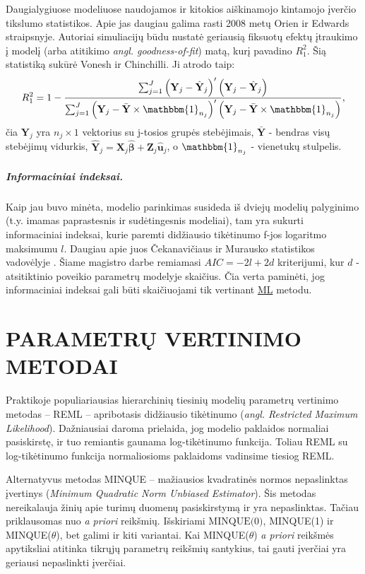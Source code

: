 \documentclass[11pt,a4paper]{article}
\begin{document}
\indent Daugialygiuose modeliuose naudojamos ir kitokios aiškinamojo kintamojo įverčio tikslumo statistikos. Apie jas daugiau galima rasti 2008 metų Orien ir Edwards\cite{fixedTest} straipsnyje. Autoriai simuliacijų būdu nustatė geriausią fiksuotų efektų įtraukimo į modelį (arba atitikimo \textit{angl. goodness-of-fit}) matą, kurį pavadino $R^2_1$. Šią statistiką sukūrė Vonesh ir Chinchilli\cite{Rtest}. Ji atrodo taip:
\begin{equation*} \label{eq:r2}
R^2_1=1-\dfrac{\sum^J_{j=1}\left(\mathbf{Y}_{j}-\hat{\mathbf{Y}}_{j}\right)'\left(\mathbf{Y}_{j}-\hat{\mathbf{Y}}_{j}\right)}{\sum^J_{j=1}\left(\mathbf{Y}_{j}-\bar{\mathbf{Y}}\times\mathbbm{1}_{n_j}\right)'\left(\mathbf{Y}_{j}-\bar{\mathbf{Y}}\times\mathbbm{1}_{n_j}\right)},
\end{equation*}
čia $\mathbf{Y}_j$ yra $n_j\times1$ vektorius su j-tosios grupės stebėjimais, $\bar{\mathbf{Y}}$ - bendras visų stebėjimų vidurkis, $\hat{\mathbf{Y}}_j=\mathbf{X}_j\hat{\boldsymbol{\beta}}+\mathbf{Z}_j\hat{\mathbf{u}}_j$, o $\mathbbm{1}_{n_j}$ - vienetukų stulpelis.

\subparagraph{Informaciniai indeksai.} Kaip jau buvo minėta, modelio parinkimas susideda iš dviejų modelių palyginimo (t.y. imamas paprastesnis ir sudėtingesnis modeliai), tam yra sukurti informaciniai indeksai, kurie paremti didžiausio tikėtinumo f-jos logaritmo maksimumu $l$. Daugiau apie juos Čekanavičiaus ir Murausko statistikos vadovėlyje \cite{cek}. Šiame magistro darbe remiamasi $AIC=-2l+2d$ kriterijumi, kur $d$ - atsitiktinio poveikio parametrų modelyje skaičius. Čia verta paminėti, jog informaciniai indeksai gali būti skaičiuojami tik vertinant \hyperlink{reml}{ML} metodu.

\newpage
\section{PARAMETRŲ VERTINIMO METODAI} \label{sec:vert}
\indent Praktikoje populiariausias hierarchinių tiesinių modelių parametrų vertinimo metodas -- REML -- apribotasis didžiausio tikėtinumo (\textit{angl. Restricted Maximum Likelihood}). Dažniausiai daroma prielaida, jog modelio paklaidos normaliai pasiskirstę, ir tuo remiantis gaunama log-tikėtinumo funkcija. Toliau REML su log-tikėtinumo funkcija normaliosioms paklaidoms vadinsime tiesiog REML. 

\indent Alternatyvus metodas MINQUE -- mažiausios kvadratinės normos nepaslinktas įvertinys (\textit{Minimum Quadratic Norm Unbiased Estimator}). Šis metodas nereikalauja žinių apie turimų duomenų pasiskirstymą ir yra nepaslinktas. Tačiau priklausomas nuo \textit{a priori} reikšmių. Išskiriami $\text{MINQUE(0)}$, MINQUE(1) ir MINQUE($\theta$), bet galimi ir kiti variantai. Kai MINQUE($\theta$) \textit{a priori} reikšmės apytiksliai atitinka tikrųjų parametrų reikšmių santykius, tai gauti įverčiai yra geriausi nepaslinkti įverčiai.
\end{document}
